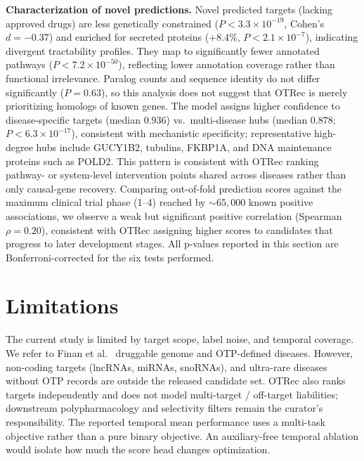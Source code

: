 \documentclass{article}
\begin{document}
\textbf{Characterization of novel predictions.}
Novel predicted targets (lacking approved drugs) are less genetically
constrained ($P < 3.3 \times 10^{-19}$, Cohen's $d{=}{-}0.37$) and
enriched for secreted proteins ($+8.4\%$, $P < 2.1 \times 10^{-7}$),
indicating divergent tractability profiles.
They map to significantly fewer annotated pathways
($P < 7.2 \times 10^{-50}$), reflecting lower annotation coverage
rather than functional irrelevance.
Paralog counts and sequence identity do not differ significantly
($P{=}0.63$), so this analysis does not suggest that OTRec is merely
prioritizing homologs of known genes.
The model assigns higher confidence to disease-specific targets
(median $0.936$) vs.\ multi-disease hubs (median $0.878$;
$P < 6.3 \times 10^{-17}$), consistent with mechanistic specificity;
representative high-degree hubs include GUCY1B2, tubulins, FKBP1A, and
DNA maintenance proteins such as POLD2.
This pattern is consistent with OTRec ranking pathway- or system-level
intervention points shared across diseases rather than only causal-gene
recovery. %
Comparing out-of-fold prediction scores against the maximum clinical trial
phase (1--4) reached by ${\sim}65{,}000$ known positive associations,
we observe a weak but significant positive correlation
(Spearman $\rho{=}0.20$), consistent with OTRec assigning higher
scores to candidates that progress to later development stages.
All p-values reported in this section are Bonferroni-corrected for the
six tests performed.

\section{Limitations}
\label{sec:limitations}
The current study is limited by target scope, label noise, and temporal coverage. We refer to Finan et al.~\citep{finan2017}
druggable genome and OTP-defined diseases. However, non-coding targets (lncRNAs, miRNAs, snoRNAs), and ultra-rare diseases without OTP records are outside the released candidate set. OTRec also ranks targets independently and
does not model multi-target / off-target liabilities; downstream
polypharmacology and selectivity filters remain the curator's
responsibility. 
The reported temporal mean performance uses a multi-task
objective rather than a pure binary objective. An auxiliary-free temporal ablation would isolate how much the score head changes optimization.
\end{document}
